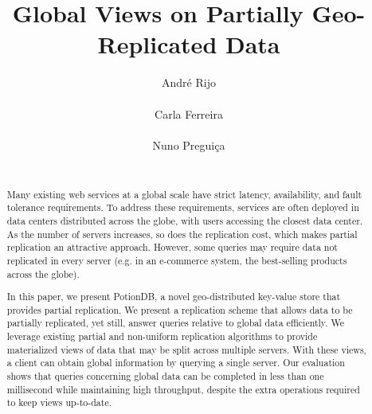 \documentclass{vldb}
\begin{document}
\title{Global Views on Partially Geo-Replicated Data}

\author{\alignauthor André Rijo\\
       \\
\alignauthor Carla Ferreira\\
       \\
\alignauthor
Nuno Preguiça\\
       \\
}


\maketitle

\begin{abstract}

Many existing web services at a global scale have strict latency, availability, and fault tolerance requirements.
To address these requirements,  services are often deployed in data centers distributed 
across the globe, with users accessing the closest data center.
As the number of servers increases, so does the replication cost, which makes partial replication an attractive approach.
However, some queries may require data not replicated in every server (e.g. in an e-commerce system, the best-selling products across the globe).

In this paper, we present PotionDB, a novel geo-distributed key-value store that provides partial replication.
We present a replication scheme that allows data to be partially replicated, yet still, answer queries relative to global data efficiently.
We leverage existing partial and non-uniform replication algorithms to provide materialized views of data that may be split across multiple servers.
With these views, a client can obtain global information by querying a single server.
Our evaluation shows that queries concerning global data can be completed in less than one millisecond while maintaining high throughput, despite the extra operations required to keep views up-to-date. 

\end{abstract}
\end{document}
